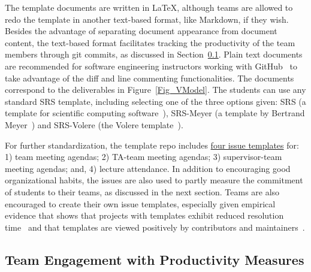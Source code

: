 \documentclass[10pt, conference]{IEEEtran}
\begin{document}
The template documents are written in \LaTeX, although teams are allowed to redo
the template in another text-based format, like Markdown, if they wish. Besides
the advantage of separating document appearance from document content, the
text-based format facilitates tracking the productivity of the team members
through git commits, as discussed in Section~\ref{Sec_TeamContribMeasure}. Plain
text documents are recommended for software engineering instructors working with
GitHub~\cite{felicianoStudentExperiencesUsing2016} to take advantage of the diff
and line commenting functionalities. The documents correspond to the
deliverables in Figure~\ref{Fig_VModel}. The students can use any standard SRS
template, including selecting one of the three options given: SRS (a template
for scientific computing software~\cite{SmithAndLai2005}), SRS-Meyer (a template
by Bertrand Meyer~\cite{Meyer2022}) and SRS-Volere (the Volere
template~\cite{RobertsonAndRobertson1999Vol}).

For further standardization, the template repo includes
\href{Redact link}
{four issue templates} for: 1) team meeting agendas; 2) TA-team meeting agendas;
3) supervisor-team meeting agendas; and, 4) lecture attendance.  In addition to
encouraging good organizational habits, the issues are also used to partly
measure the commitment of students to their teams, as discussed in the next
section.  Teams are also encouraged to create their own issue templates,
especially given  empirical evidence that shows that projects with templates
exhibit reduced resolution time~\cite{sulunEmpiricalAnalysisIssue2024} and that
templates are viewed positively by contributors and
maintainers~\cite{liFollowNotFollow2023}.

\subsection{Team Engagement with Productivity Measures} \label{Sec_TeamContribMeasure}
\end{document}
